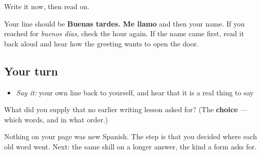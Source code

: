 Write it now, then read on.

Your line should be \textbf{Buenas tardes. Me llamo} and then your name. If you reached for \emph{buenos días}, check the hour again. If the name came first, read it back aloud and hear how the greeting wants to open the door.

\subsection*{Your turn}
\begin{itemize}
\raggedright
  \item \emph{Say it:} your own line back to yourself, and hear that it is a real thing to say
\end{itemize}

\begin{tcolorbox}[breakable,colback=teal!4,colframe=teal!35!black,title={Before you move on}]
What did you supply that no earlier writing lesson asked for? (The \textbf{choice} — which words, and in what order.)

Nothing on your page was new Spanish. The step is that you decided where each old word went. Next: the same skill on a longer answer, the kind a form asks for.
\end{tcolorbox}
